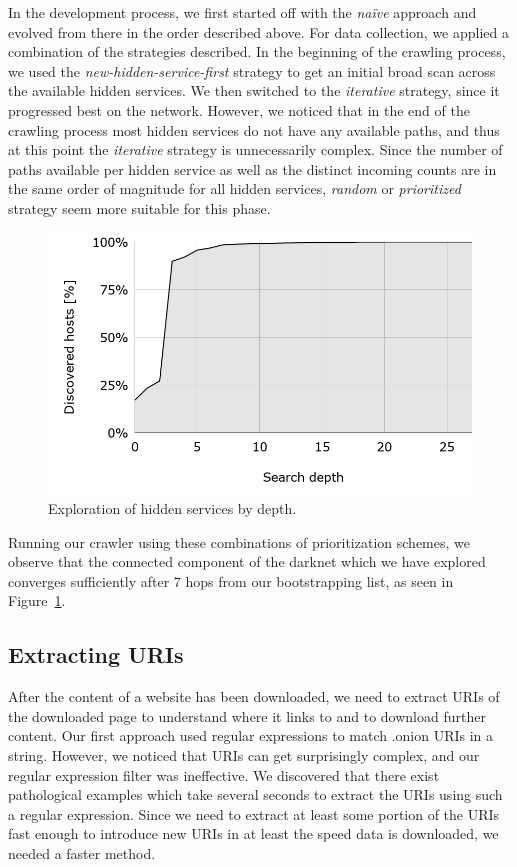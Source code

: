 \documentclass[USenglish,oneside,twocolumn]{article}
\begin{document}
In the development process, we first started off with the \emph{naïve} approach and evolved from there in the order described above. For data collection, we applied a combination of the strategies described. In the beginning of the crawling process, we used the  \emph{new-hidden-service-first} strategy to get an initial broad scan across the available hidden services. We then switched to the \emph{iterative} strategy, since it progressed best on the network. However, we noticed that in the end of the crawling process most hidden services do not have any available paths, and thus at this point the \emph{iterative} strategy is unnecessarily complex. Since the number of paths available per hidden service as well as the distinct incoming counts are in the same order of magnitude for all hidden services,  \emph{random} or  \emph{prioritized} strategy seem more suitable for this phase.

\begin{figure}[b]
    \centering
    \includegraphics[width=\linewidth]{images/PercentageByDepth.png}
    \caption{Exploration of hidden services by depth.}
    \label{fig:percentageByDepth}
\end{figure}

Running our crawler using these combinations of prioritization schemes, we observe that the connected component of the darknet which we have explored converges sufficiently after 7 hops from our bootstrapping list, as seen in Figure~\ref{fig:percentageByDepth}.

\subsection{Extracting URIs}

After the content of a website has been downloaded, we need to extract URIs of the downloaded page to understand where it links to and to download further content. Our first approach used regular expressions to match .onion URIs in a string. However, we noticed that URIs can get surprisingly complex, and our regular expression filter was ineffective. We discovered that there exist pathological examples which take several seconds to extract the URIs using such a regular expression. Since we need to extract at least some portion of the URIs fast enough to introduce new URIs in at least the speed data is downloaded, we needed a faster method.
\end{document}
